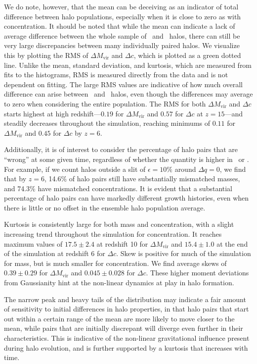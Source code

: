 We do note, however, that the mean can be deceiving as an indicator of total difference between halo populations, especially when it is close to zero as with concentration.  It should be noted that while the mean can indicate a lack of average difference between the whole sample of \lpt\ and \za\ halos, there can still be very large discrepancies between many individually paired halos.  We visualize this by plotting the RMS of $\Delta M_{\mathrm{vir}}$ and $\Delta c$, which is plotted as a green dotted line.  Unlike the mean, standard deviation, and kurtosis, which are measured from fits to the histograms, RMS is measured directly from the data and is not dependent on fitting.  The large RMS values are indicative of how much overall difference can arise between \lpt\ and \za\ halos, even though the differences may average to zero when considering the entire population.  The RMS for both $\Delta M_{\mathrm{vir}}$ and $\Delta c$ starts highest at high redshift---$0.19$ for $\Delta M_{\mathrm{vir}}$ and $0.57$ for $\Delta c$ at $z = 15$---and steadily decreases throughout the simulation, reaching minimums of $0.11$ for $\Delta M_{\mathrm{vir}}$ and $0.45$ for $\Delta c$ by $z = 6$.

Additionally, it is of interest to consider the percentage of halo pairs that are ``wrong'' at some given time, regardless of whether the quantity is higher in \lpt\ or \za.  For example, if we count halos outside a slit of $\epsilon = 10\%$ around $\Delta q = 0$, we find that by $z = 6$, 14.6\% of halo pairs still have substantially mismatched masses, and 74.3\% have mismatched concentrations.  It is evident that a substantial percentage of halo pairs can have markedly different growth histories, even when there is little or no offset in the ensemble halo population average.

Kurtosis is consistently large for both mass and concentration, with a slight increasing trend throughout the simulation for concentration.  It reaches maximum values of $17.5 \pm 2.4$ at redshift 10 for $\Delta M_{\mathrm{vir}}$ and $15.4 \pm 1.0$ at the end of the simulation at redshift 6 for $\Delta c$.  Skew is positive for much of the simulation for mass, but is much smaller for concentration.  We find average skews of $0.39 \pm 0.29$ for $\Delta M_{\mathrm{vir}}$ and $0.045 \pm 0.028$ for $\Delta c$.  These higher moment deviations from Gaussianity hint at the non-linear dynamics at play in halo formation.

The narrow peak and heavy tails of the distribution may indicate a fair amount of sensitivity to initial differences in halo properties, in that halo pairs that start out within a certain range of the mean are more likely to move closer to the mean, while pairs that are initially discrepant will diverge even further in their characteristics.  This is indicative of the non-linear gravitational influence present during halo evolution, and is further supported by a kurtosis that increases with time.

